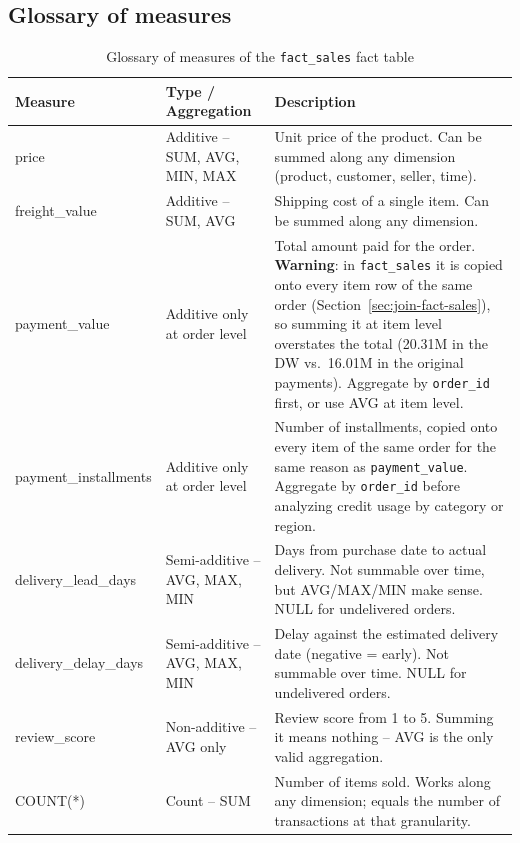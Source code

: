 \documentclass[12pt,a4paper]{article}
\begin{document}
\subsection{Glossary of measures}
\label{sec:misure}

\begin{table}[H]
  \centering
  \footnotesize
  \caption{Glossary of measures of the \texttt{fact\_sales} fact table}
  \label{tab:misure}
  \begin{tabular}{>{\ttfamily}l
                  >{\raggedright}p{3.5cm}
                  >{\raggedright\arraybackslash}p{5cm}}
    \toprule
    \textbf{Measure} & \textbf{Type / Aggregation} & \textbf{Description} \\
    \midrule
    price                & Additive -- SUM, AVG, MIN, MAX &
      Unit price of the product. Can be summed along any dimension (product,
      customer, seller, time). \\
    freight\_value       & Additive -- SUM, AVG &
      Shipping cost of a single item. Can be summed along any dimension. \\
    payment\_value       & Additive only at order level &
      Total amount paid for the order. \textbf{Warning}: in \texttt{fact\_sales} it
      is copied onto every item row of the same order
      (Section~\ref{sec:join-fact-sales}), so summing it at item level overstates
      the total (20.31M in the DW vs.\ 16.01M in the original payments). Aggregate
      by \texttt{order\_id} first, or use AVG at item level. \\
    payment\_installments & Additive only at order level &
      Number of installments, copied onto every item of the same order for the same
      reason as \texttt{payment\_value}. Aggregate by \texttt{order\_id} before
      analyzing credit usage by category or region. \\
    delivery\_lead\_days & Semi-additive -- AVG, MAX, MIN &
      Days from purchase date to actual delivery. Not summable over time, but
      AVG/MAX/MIN make sense. NULL for undelivered orders. \\
    delivery\_delay\_days & Semi-additive -- AVG, MAX, MIN &
      Delay against the estimated delivery date (negative = early). Not summable
      over time. NULL for undelivered orders. \\
    review\_score        & Non-additive -- AVG only &
      Review score from 1 to 5. Summing it means nothing -- AVG is the only valid
      aggregation. \\
    COUNT(*)             & Count -- SUM &
      Number of items sold. Works along any dimension; equals the number of
      transactions at that granularity. \\
    \bottomrule
  \end{tabular}
\end{table}
\end{document}
